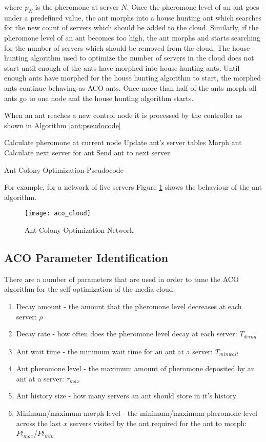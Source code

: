 where $p_{N}$ is the pheromone at server $N$. Once the pheromone level of an ant goes under a predefined value, the ant morphs into a house hunting ant which searches for the new count of servers which should be added to the cloud. Similarly, if the pheromone level of an ant becomes too high, the ant morphs and starts searching for the number of servers which should be removed from the cloud. The house hunting algorithm used to optimize the number of servers in the cloud does not start until enough of the ants have morphed into house hunting ants. Until enough ants have morphed for the house hunting algorithm to start, the morphed ants continue behaving as ACO ants. Once more than half of the ants morph all ants go to one node and the house hunting algorithm starts.

When an ant reaches a new control node it is processed by the controller as shown in Algorithm \ref{ant:pseudocode}

\begin{algorithm}
\begin{algorithmic}
	\State Calculate pheromone at current node
	\State Update ant's server tables
		\State Morph ant
	\Else
		\State Calculate next server for ant
		\State Send ant to next server
	\EndIf
\end{algorithmic}
\caption{Ant Colony Optimization Pseudocode}\label{ant:pseudocode}
\end{algorithm}

For example, for a network of five servers Figure \ref{fig:antnetwork} shows the behaviour of the ant algorithm.

\begin{figure}
	\centering
	\texttt{[image: aco\_cloud]}
	\caption{Ant Colony Optimization Network}
	\label{fig:antnetwork}
\end{figure}

\subsection{ACO Parameter Identification}

There are a number of parameters that are used in order to tune the ACO algorithm for the self-optimization of the media cloud:

\begin{enumerate}
	\item Decay amount - the amount that the pheromone level decreases at each server: $\rho$
	\item Decay rate - how often does the pheromone level decay at each server: $T_{decay}$
	\item Ant wait time - the minimum wait time for an ant at a server: $T_{minwait}$
	\item Ant pheromone level - the maximum amount of pheromone deposited by an ant at a server: $\tau_{max}$
	\item Ant history size - how many servers an ant should store in it's history
	\item Minimum/maximum morph level - the minimum/maximum pheromone level across the last $x$ servers visited by the ant required for the ant to morph: $Pt_{max}$/$Pt_{min}$
\end{enumerate}

